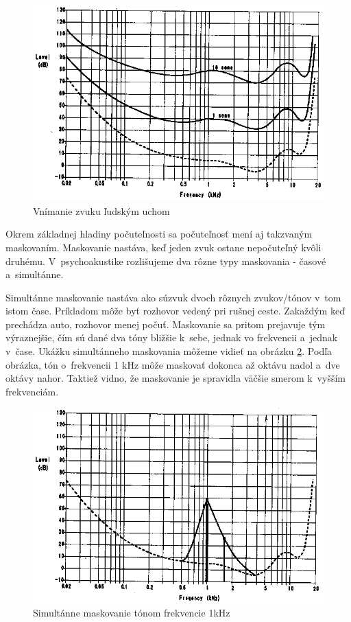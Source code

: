 \begin{figure}[htp]
    \centering
    \includegraphics{obrazky/informatika/audio/equi_loudness}
    \caption{Vnímanie zvuku ľudským uchom}
    \label{fig:equi_loudness}
\end{figure}

Okrem základnej hladiny počuteľnosti sa počuteľnosť mení aj takzvaným
maskovaním.
Maskovanie nastáva, keď jeden zvuk ostane nepočuteľný kvôli druhému. 
V~psychoakustike rozlišujeme dva rôzne typy maskovania - časové 
a~simultánne.

Simultánne maskovanie nastáva ako súzvuk dvoch rôznych zvukov/tónov v~tom
istom čase. Príkladom môže byť rozhovor vedený pri rušnej ceste.
Zakaždým keď prechádza auto, rozhovor menej počuť. Maskovanie sa
pritom prejavuje tým výraznejšie, čím sú dané dva tóny bližšie k~sebe,
jednak vo frekvencii a~jednak v~čase. Ukážku simultánneho maskovania
môžeme vidieť na obrázku \ref{fig:simultaneous_masking}. Podľa
obrázka, tón o~frekvencii 1 kHz môže maskovať dokonca až oktávu nadol
a~dve oktávy nahor. Taktiež vidno, že maskovanie je spravidla väčšie
smerom k~vyšším frekvenciám.

\begin{figure}[htp]
    \centering
    \includegraphics{obrazky/informatika/audio/simultaneous_masking}
    \caption{Simultánne maskovanie tónom frekvencie 1kHz}
    \label{fig:simultaneous_masking}
\end{figure}


